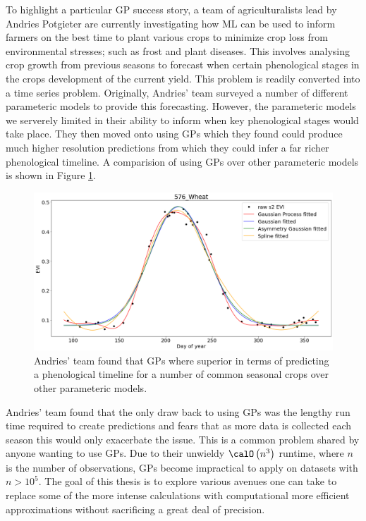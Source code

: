 To highlight a particular GP success story, a team of agriculturalists lead by Andries Potgieter are currently investigating how ML can be used to inform farmers on the best time to plant various crops to minimize crop loss from environmental stresses; such as frost and plant diseases. This involves analysing crop growth from previous seasons to forecast when certain phenological stages in the crops development of the current yield. This problem is readily converted into a time series problem. Originally, Andries' team surveyed a number of different parameteric models to provide this forecasting. However, the parameteric models we serverely limited in their ability to inform when key phenological stages would take place. They then moved onto using GPs which they found could produce much higher resolution predictions from which they could infer a far richer phenological timeline. A comparision of using GPs over other parameteric models is shown in Figure \ref{fig: GP_motivate_wheat}.
\begin{figure}[h]
    \centering
    \includegraphics[scale=0.3]{img/yan_wheat_GPR_plot.png}
    \caption{Andries' team found that GPs where superior in terms of predicting a phenological timeline for a number of common seasonal crops over other parameteric models.}
    \label{fig: GP_motivate_wheat}
\end{figure}
Andries' team found that the only draw back to using GPs was the lengthy run time required to create predictions and fears that as more data is collected each season this would only exacerbate the issue. This is a common problem shared by anyone wanting to use GPs. Due to their unwieldy $\calO \left( n^3 \right)$ runtime, where $n$ is the number of observations,  GPs become impractical to apply on datasets with $n > 10^5$. The goal of this thesis is to explore various avenues one can take to replace some of the more intense calculations with computational more efficient approximations without sacrificing a great deal of precision.

